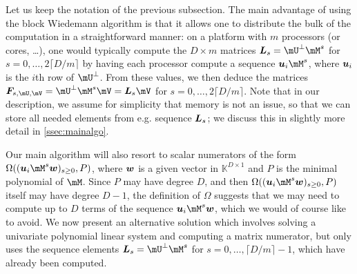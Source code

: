 \documentclass[12pt]{article}
\newcommand{\mat}[1]{\bm{\MakeUppercase{#1}}} %
\newcommand{\row}[1]{\bm{\MakeLowercase{#1}}} %
\newcommand{\col}[1]{\bm{\MakeLowercase{#1}}} %
\newcommand{\seqelt}[1]{\bm{F}_{#1}} %
\newcommand{\minpoly}{P}
\def\K{\mathbb{K}}
\def\K {\ensuremath{\mathbb{K}}}
\begin{document}
Let us keep the notation of the previous subsection.  The main
advantage of using the block Wiedemann algorithm is that it allows one
to distribute the bulk of the computation in a straightforward manner:
on a platform with $m$ processors (or cores, \dots), one would
typically compute the $D \times m$ matrices $\mat{L}_s=\mU^\perp\mM^s$
for $s=0,\dots,2\lceil D/m \rceil$ by having each processor compute a
sequence $\row{u}_i \mM^s$, where $\row{u}_i$ is the $i$th row of
$\mU^\perp$. From these values, we then deduce the matrices
$\seqelt{s,\mU,\mV}=\mU^\perp \mM^s \mV = \mat{L}_s\mV$ for
$s=0,\dots,2\lceil D/m \rceil$. Note that in our description, we
assume for simplicity that memory is not an issue, so that we can
store all needed elements from e.g. sequence $\mat{L}_s$; we discuss
this in slightly more detail in \cref{ssec:mainalgo}.

Our main algorithm will also resort to scalar numerators of
the form $\Omega((\row{u}_i \mM^s \col{w})_{s \ge 0},
\minpoly)$, where $\row{w}$ is a given vector in $\K^{D \times 1}$ and
$\minpoly$ is the minimal polynomial of $\mM$. Since $\minpoly$ may
have degree $D$, and then $\Omega((\row{u}_i \mM^s \col{w})_{s \ge 0},
\minpoly)$ itself may have degree $D-1$,
the definition of $\Omega$ suggests that we
may need to compute up to $D$ terms of the sequence $\row{u}_i \mM^s
\col{w}$, which we would of course like to avoid. We now present an
alternative solution which involves solving a univariate polynomial linear system
and computing a matrix numerator, but only uses the sequence elements
$\mat{L}_s= \mU^\perp \mM^s$ for $s=0,\dots,\lceil D/m \rceil-1$,
which have already been computed.
\end{document}
